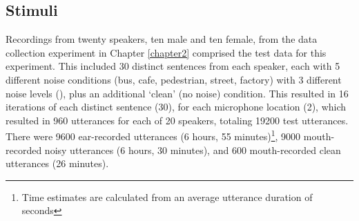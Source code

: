 \subsection{Stimuli}
\label{chap4:methods:stimuli}

Recordings from twenty speakers, ten male and ten female, from the data collection experiment in Chapter \ref{chapter2} comprised the test data for this experiment.  This included 30 distinct sentences from each speaker, each with 5 different noise conditions (bus, cafe, pedestrian, street, factory) with 3 different noise levels (\DIFdelbegin {}\DIFdelend \DIFaddbegin {}\DIFaddend ), plus an additional `clean' (no noise) condition.  This resulted in 16 iterations of each distinct sentence (30), for each microphone location (2), which resulted in 960 utterances for each of 20 speakers, totaling 19200 test utterances.  There were 9600 ear-recorded utterances (6 hours, 55 minutes)\footnote{Time estimates are calculated from an average utterance duration of \DIFdelbegin \DIFdel{~}\DIFdelend \DIFaddbegin {} seconds}, 9000 mouth-recorded noisy utterances (6 hours, 30 minutes), and 600 mouth-recorded clean utterances (26 minutes).

